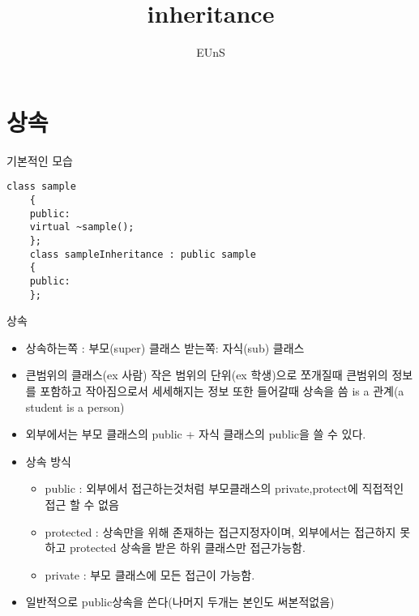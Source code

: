 \documentclass[10pt]{beamer}
\title{inheritance}
\author{EUnS}
\begin{document}
\begin{frame}{}
    \maketitle
\end{frame}    

\begin{frame}{}
    \tableofcontents
\end{frame}   

\section{상속}


\begin{frame}[fragile]{기본적인 모습}
    \begin{lstlisting}[style = CppStyle]
    class sample
    {
    public:
    virtual ~sample();
    };
    class sampleInheritance : public sample
    {
    public:
    };
    \end{lstlisting}
\end{frame}    


\begin{frame}{상속}
    \begin{itemize}
        \item 상속하는쪽 : 부모(super) 클래스 받는쪽: 자식(sub) 클래스
        \item 큰범위의 클래스(ex 사람) 작은 범위의 단위(ex 학생)으로 쪼개질때 큰범위의 정보를 포함하고 작아짐으로서 세세해지는 정보 또한 들어갈때 상속을 씀 is a 관계(a student is a person)
        \item 외부에서는 부모 클래스의 public + 자식 클래스의 public을 쓸 수 있다.
        \item 상속 방식 
        \begin{itemize}
            \item public : 외부에서 접근하는것처럼 부모클래스의 private,protect에 직접적인 접근 할 수 없음
            \item protected : 상속만을 위해 존재하는 접근지정자이며, 외부에서는 접근하지 못하고 protected 상속을 받은 하위 클래스만 접근가능함.
            \item private : 부모 클래스에 모든 접근이 가능함.
        \end{itemize}
        \item 일반적으로 public상속을 쓴다(나머지 두개는 본인도 써본적없음)
    \end{itemize}
\end{frame}
\end{document}
